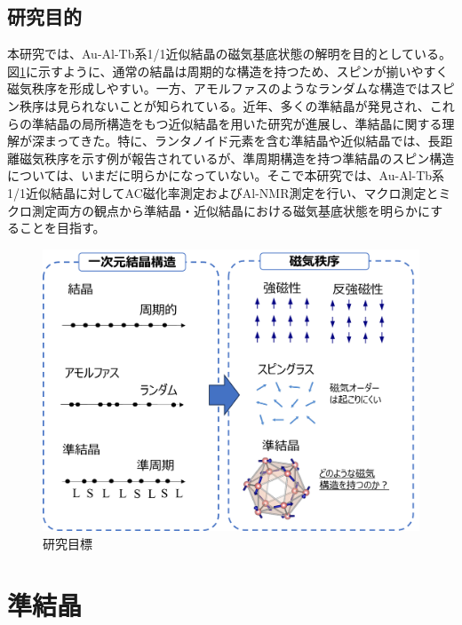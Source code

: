 \documentclass[11pt,a4j]{jreport}
\begin{document}
\section{研究目的}
本研究では、Au-Al-Tb系1/1近似結晶の磁気基底状態の解明を目的としている。図\ref{purpose_of_research}に示すように、通常の結晶は周期的な構造を持つため、スピンが揃いやすく磁気秩序を形成しやすい。一方、アモルファスのようなランダムな構造ではスピン秩序は見られないことが知られている。近年、多くの準結晶が発見され、これらの準結晶の局所構造をもつ近似結晶を用いた研究が進展し、準結晶に関する理解が深まってきた。特に、ランタノイド元素を含む準結晶や近似結晶では、長距離磁気秩序を示す例が報告されているが、準周期構造を持つ準結晶のスピン構造については、いまだに明らかになっていない。そこで本研究では、Au-Al-Tb系1/1近似結晶に対してAC磁化率測定およびAl-NMR測定を行い、マクロ測定とミクロ測定両方の観点から準結晶・近似結晶における磁気基底状態を明らかにすることを目指す。

\begin{figure}[htbp]
  \centering
  \vspace{10mm}
  \includegraphics[width=140mm]{./figure/purpose_of_research.png}
  \caption{研究目標}
  \label{purpose_of_research}
\end{figure}
\chapter{準結晶}
\end{document}
